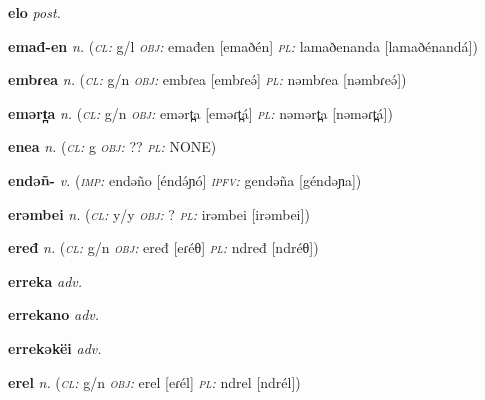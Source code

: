 \newentry
\headword\textbf{elo}  
\ipa{[elo]}
\synpos\textit{post.} 

\newentry
\headword\textbf{emađ-en}  
\ipa{[emað-én]}
\synpos\textit{n.} 
\class(\textit{\textsc{cl:}} {g/l}
\object\textit{\textsc{obj:}} emađen [emaðén]
\plural\textit{\textsc{pl:}} lamaðenanda [lamaðénandá])

\newentry
\headword\textbf{embɾea}  
\ipa{[embɾeə́]}
\synpos\textit{n.} 
\class(\textit{\textsc{cl:}} {g/n}
\object\textit{\textsc{obj:}} embɾea [embɾeə́]
\plural\textit{\textsc{pl:}} nəmbɾea [nəmbɾeə́])

\newentry
\headword\textbf{emərt̪a}  
\ipa{[eməɾt̪á]}
\synpos\textit{n.} 
\class(\textit{\textsc{cl:}} {g/n}
\object\textit{\textsc{obj:}} emərt̪a [eməɾt̪á]
\plural\textit{\textsc{pl:}} nəmərt̪a [nəməɾt̪á])


\newentry
\headword\textbf{enea}  
\ipa{[énéə]}
\synpos\textit{n.} 
\class(\textit{\textsc{cl:}} {g}
\object\textit{\textsc{obj:}} ??
\plural\textit{\textsc{pl:}} NONE)

\newentry
\headword\textbf{endəñ-}
\ipa{[éndə́ɲ-]}
\synpos\textit{v.} 
\imperative(\textit {\textsc{imp:}} endəño [éndə́ɲó] 
\imperfective\textit{\textsc{ipfv:}} gendəña [géndəɲa])

\newentry
\headword\textbf{erəmbei}  
\ipa{[erəmbei]}
\synpos\textit{n.} 
\class(\textit{\textsc{cl:}} {y/y}
\object\textit{\textsc{obj:}} ? 
\plural\textit{\textsc{pl:}} irəmbei [irəmbei])

\newentry
\headword\textbf{eređ}  
\ipa{[eɾéθ]}
\synpos\textit{n.} 
\class(\textit{\textsc{cl:}} {g/n}
\object\textit{\textsc{obj:}} eređ [eɾéθ]
\plural\textit{\textsc{pl:}} ndređ [ndréθ])

\newentry
\headword\textbf{erreka}  
\ipa{[éréká]}
\synpos\textit{adv.} 

\newentry
\headword\textbf{errekano}  
\ipa{[érékánó]}
\synpos\textit{adv.} 

\newentry
\headword\textbf{errekəkëi}  
\ipa{[érékə́kɜ́i]}
\synpos\textit{adv.} 

\newentry
\headword\textbf{erel}  
\ipa{[eɾél]}
\synpos\textit{n.} 
\class(\textit{\textsc{cl:}} {g/n}
\object\textit{\textsc{obj:}} erel [eɾél]
\plural\textit{\textsc{pl:}} ndrel [ndrél])

